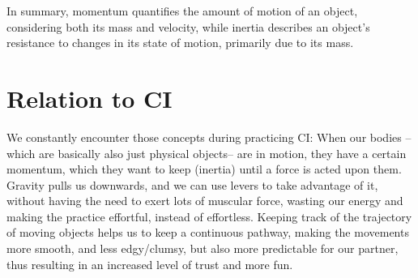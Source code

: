 In summary, momentum quantifies the amount of motion of an object, considering both its mass and velocity, while inertia describes an object's resistance to changes in its state of motion, primarily due to its mass.

\section{Relation to CI}\label{sec:relation-to-ci}

We constantly encounter those concepts during practicing CI: When our bodies --which are basically also just physical objects-- are in motion, they have a certain momentum, which they want to keep (inertia) until a force is acted upon them.
Gravity pulls us downwards, and we can use levers to take advantage of it, without having the need to exert lots of muscular force, wasting our energy and making the practice effortful, instead of effortless.
Keeping track of the trajectory of moving objects helps us to keep a continuous pathway, making the movements more smooth, and less edgy/clumsy, but also more predictable for our partner, thus resulting in an increased level of trust and more fun.
